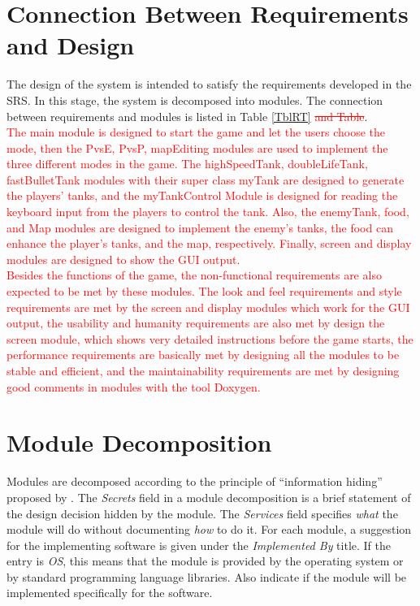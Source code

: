 \documentclass[12pt, titlepage]{article}
\begin{document}
\section{Connection Between Requirements and Design} \label{SecConnection}

The design of the system is intended to satisfy the requirements developed in
the SRS. In this stage, the system is decomposed into modules. The connection
between requirements and modules is listed in Table \ref{TblRT} \textcolor{red}{\sout{and Table}}.\\
\textcolor{red}{The main module is designed to start the game and let the users choose the mode, then the PvsE, PvsP, mapEditing modules are used to implement the three different modes in the game. The highSpeedTank, doubleLifeTank, fastBulletTank modules with their super class myTank are designed to generate the players' tanks, and the myTankControl Module is designed for reading the keyboard input from the players to control the tank. Also, the enemyTank, food, and Map modules are designed to implement the enemy's tanks, the food can enhance the player's tanks, and the map, respectively. Finally, screen and display modules are designed to show the GUI output.\\ Besides the functions of the game, the non-functional requirements are also expected to be met by these modules. The look and feel requirements and style requirements are met by the screen and display modules which work for the GUI output, the usability and humanity requirements are also met by design the screen module, which shows very detailed instructions before the game starts, the performance requirements are basically met by designing all the modules to be stable and efficient, and the maintainability requirements are met by designing good comments in modules with the tool Doxygen.}

\section{Module Decomposition} \label{SecMD}

Modules are decomposed according to the principle of ``information hiding''
proposed by \citet{ParnasEtAl1984}. The \emph{Secrets} field in a module
decomposition is a brief statement of the design decision hidden by the
module. The \emph{Services} field specifies \emph{what} the module will do
without documenting \emph{how} to do it. For each module, a suggestion for the
implementing software is given under the \emph{Implemented By} title. If the
entry is \emph{OS}, this means that the module is provided by the operating
system or by standard programming language libraries.  Also indicate if the
module will be implemented specifically for the software.
\end{document}

